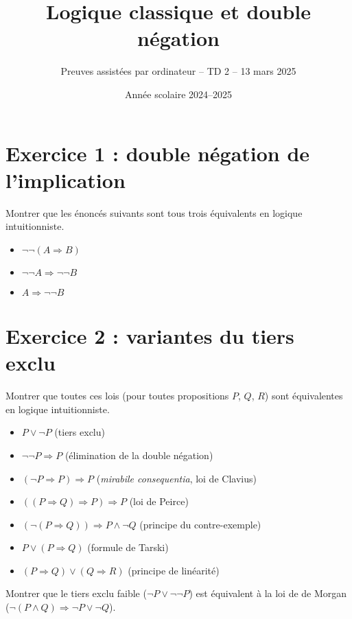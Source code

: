 \documentclass{article}
\begin{document}
\title{Logique classique et double négation}
\author{Preuves assistées par ordinateur -- TD 2 -- 13 mars 2025}
\date{Année scolaire 2024--2025}
\maketitle

\section*{Exercice 1 : double négation de l'implication}
Montrer que les énoncés suivants sont tous trois équivalents en logique intuitionniste.

\begin{itemize}
\item \(\neg\neg (A \Rightarrow B)\)
\item \(\neg \neg A \Rightarrow \neg \neg B\)
\item \(A \Rightarrow \neg \neg B\)
\end{itemize}

\section*{Exercice 2 : variantes du tiers exclu}

Montrer que toutes ces lois (pour toutes propositions \(P\), \(Q\), \(R\)) sont équivalentes en logique intuitionniste.

\begin{itemize}
\item \(P \vee \neg P\) (tiers exclu)
\item \(\neg \neg P \Rightarrow P\) (élimination de la double négation)
\item \((\neg P \Rightarrow P) \Rightarrow P\) (\emph{mirabile consequentia}, loi de Clavius)
\item \(((P \Rightarrow Q) \Rightarrow P) \Rightarrow P\) (loi de Peirce)
\item \((\neg (P \Rightarrow Q)) \Rightarrow P \wedge \neg Q\) (principe du contre-exemple)
\item \(P \vee (P \Rightarrow Q)\) (formule de Tarski)
\item \((P \Rightarrow Q) \vee (Q \Rightarrow R)\) (principe de linéarité)
\end{itemize}

Montrer que le tiers exclu faible (\(\neg P \vee \neg \neg P\)) est équivalent à la loi de de Morgan (\(\neg (P \wedge Q) \Rightarrow \neg P \vee \neg Q\)).
\end{document}
